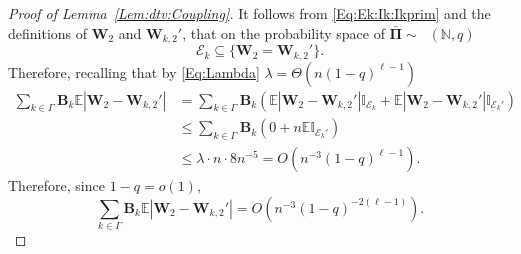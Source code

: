 \documentclass[letterpaper,11pt]{article}
\theoremstyle{definition}
\theoremstyle{remark}
\renewcommand{\le}{\leqslant}
\DeclareMathOperator{\Mallows}{Mallows_{seq}}
\newcommand{\bE}{\mathbb{E}}
\newcommand{\bB}{\mathbf{B}}
\newcommand{\Ind}{\mathbb{I}}
\newcommand{\barPi}{\bar {\mathbf \Pi}}
\newcommand{\NN}{\mathbb{N}}
\newcommand{\cE}{\mathcal{E}}
\newcommand{\bW}{\mathbf{W}}
\begin{document}
\begin{proof}[Proof of Lemma~\ref{Lem:dtv:Coupling}]
	It follows from \eqref{Eq:Ek:Ik:Ikprim} and the definitions of $\bW_2$ and $\bW_{k,2}'$, that on the probability space of $\barPi\sim \Mallows(\NN,q)$
	\begin{equation}\label{Eq:Ek:WWprim}
		\cE_k\subseteq \{\bW_2=\bW_{k,2}'\}.
	\end{equation}
	Therefore, recalling that by \eqref{Eq:Lambda} $\lambda=\Theta(n(1-q)^{\ell-1})$ 
	\[
	\begin{split}
		\sum_{k\in \Gamma}\bB_k\bE|\bW_2-\bW_{k,2}'|
		&= \sum_{k\in \Gamma}\bB_k\left(\bE|\bW_2-\bW_{k,2}'|\Ind_{\cE_k}+\bE|\bW_2-\bW_{k,2}'|\Ind_{\cE_k'}\right)\\
		&\le\sum_{k\in \Gamma}\bB_k(0+n\bE \Ind_{\cE_k'})
		\\
		&\le  \lambda\cdot n\cdot 8n^{-5} = O(n^{-3}(1-q)^{\ell-1}).
	\end{split}
	\]
	Therefore, since $1-q=o(1)$, \[\sum_{k\in \Gamma}\bB_k\bE|\bW_2-\bW_{k,2}'| = O(n^{-3}(1-q)^{-2(\ell-1)}). \]
	

\end{proof}
\end{document}
